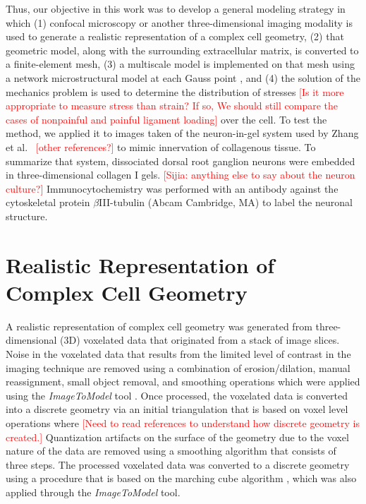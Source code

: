\documentclass[]{interact}
\newcommand{\red}[1]{\textcolor{red}{[#1]}}
\begin{document}
Thus, our objective in this work was to develop a general modeling strategy in which (1) confocal microscopy or another three-dimensional imaging modality is used to generate a realistic representation of a complex cell geometry, (2) that geometric model, along with the surrounding extracellular matrix, is converted to a finite-element mesh, (3) a multiscale model is implemented on that mesh using a network microstructural model at each Gauss point \citep{Chandran:2007hy,Stylianopoulos:2007dp}, and (4) the solution of the mechanics problem is used to determine the distribution of stresses \red{Is it more appropriate to measure stress than strain? If so, We should still compare the cases of nonpainful and painful ligament loading} over the cell. To test the method, we applied it to images taken of the neuron-in-gel system used by Zhang et al.\ \citep{Zhang:2016ga} \red{other references?} to  mimic innervation of collagenous tissue. To summarize that system, dissociated dorsal root ganglion neurons were embedded in three-dimensional collagen I gels. \red{Sijia: anything else to say about the neuron culture?} Immunocytochemistry was performed with an antibody against the cytoskeletal protein $\beta$III-tubulin (Abcam Cambridge, MA) to label the neuronal structure.

\section{Realistic Representation of Complex Cell Geometry}

A realistic representation of complex cell geometry was generated from three-dimensional (3D) voxelated data that originated from a stack of image slices. Noise in the voxelated data that results from the limited level of contrast in the imaging technique are removed using a combination of erosion/dilation, manual reassignment, small object removal, and smoothing operations which were applied using the \textit{ImageToModel} tool \citep{Klaas:2013ug, Klaas_conference, simmetrix}. Once processed, the voxelated data is converted into a discrete geometry via an initial triangulation that is based on voxel level operations where \red{Need to read references to understand how discrete geometry is created.} Quantization artifacts on the surface of the geometry due to the voxel nature of the data are removed using a smoothing algorithm that consists of three steps. The processed voxelated data was converted to a discrete geometry using a procedure that is based on the marching cube algorithm \citep{Lorensen:1987vr}, which was also applied through the \textit{ImageToModel} tool.
\end{document}
